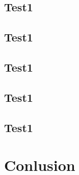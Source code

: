 \documentclass{article}
\begin{document}
\subsection{Test1}

\subsection{Test1}
\subsection{Test1}
\subsection{Test1}
\subsection{Test1}


\section{Conlusion}
\end{document}
